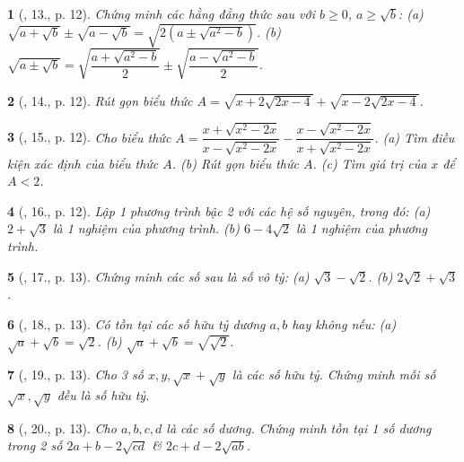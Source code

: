 \documentclass{article}
\newtheorem{baitoan}{}%
\begin{document}
\begin{baitoan}[\cite{Binh_Toan_9_tap_1}, 13., p. 12]
	Chứng minh các hằng đẳng thức sau với $b\ge0$, $a\ge\sqrt{b}$: (a) $\sqrt{a + \sqrt{b}}\pm\sqrt{a - \sqrt{b}} = \sqrt{2(a\pm\sqrt{a^2 - b})}$. (b) $\sqrt{a\pm\sqrt{b}} = \sqrt{\dfrac{a + \sqrt{a^2 - b}}{2}}\pm\sqrt{\dfrac{a - \sqrt{a^2 - b}}{2}}$.
\end{baitoan}

\begin{baitoan}[\cite{Binh_Toan_9_tap_1}, 14., p. 12]
	Rút gọn biểu thức $A = \sqrt{x + 2\sqrt{2x - 4}} + \sqrt{x - 2\sqrt{2x - 4}}$.
\end{baitoan}

\begin{baitoan}[\cite{Binh_Toan_9_tap_1}, 15., p. 12]
	Cho biểu thức $A = \dfrac{x + \sqrt{x^2 - 2x}}{x - \sqrt{x^2 - 2x}} - \dfrac{x - \sqrt{x^2 - 2x}}{x + \sqrt{x^2 - 2x}}$. (a) Tìm điều kiện xác định của biểu thức $A$. (b) Rút gọn biểu thức $A$. (c) Tìm giá trị của $x$ để $A < 2$.
\end{baitoan}

\begin{baitoan}[\cite{Binh_Toan_9_tap_1}, 16., p. 12]
	Lập 1 phương trình bậc 2 với các hệ số nguyên, trong đó: (a) $2 + \sqrt{3}$ là 1 nghiệm của phương trình. (b) $6 - 4\sqrt{2}$ là 1 nghiệm của phương trình.
\end{baitoan}

\begin{baitoan}[\cite{Binh_Toan_9_tap_1}, 17., p. 13]
	Chứng minh các số sau là số vô tỷ: (a) $\sqrt{3} - \sqrt{2}$. (b) $2\sqrt{2} + \sqrt{3}$.
\end{baitoan}

\begin{baitoan}[\cite{Binh_Toan_9_tap_1}, 18., p. 13]
	Có tồn tại các số hữu tỷ dương $a,b$ hay không nếu: (a) $\sqrt{a} + \sqrt{b} = \sqrt{2}$. (b) $\sqrt{a} + \sqrt{b} = \sqrt{\sqrt{2}}$.
\end{baitoan}

\begin{baitoan}[\cite{Binh_Toan_9_tap_1}, 19., p. 13]
	Cho 3 số $x,y,\sqrt{x} + \sqrt{y}$ là các số hữu tỷ. Chứng minh mỗi số $\sqrt{x},\sqrt{y}$ đều là số hữu tỷ.
\end{baitoan}

\begin{baitoan}[\cite{Binh_Toan_9_tap_1}, 20., p. 13]
	Cho $a,b,c,d$ là các số dương. Chứng minh tồn tại 1 số dương trong 2 số $2a + b - 2\sqrt{cd}$ \& $2c + d - 2\sqrt{ab}$.
\end{baitoan}
\end{document}
